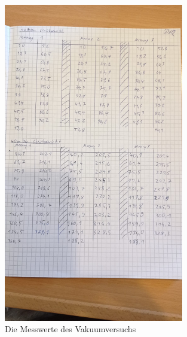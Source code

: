 \begin{figure}[h]
    \centering
    \includegraphics[width=0.7\textwidth]{latex/images/Messwerte_3.jpeg}
    \caption{Die Messwerte des Vakuumversuchs}
\end{figure}


